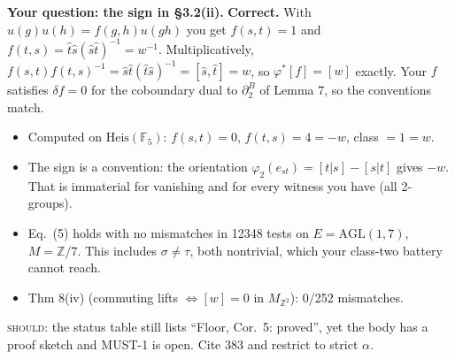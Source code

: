 \documentclass[10pt]{article}
\newcommand{\Z}{\mathbb{Z}}
\newcommand{\iss}[1]{\textsc{#1}}
\begin{document}
\textbf{Your question: the sign in \S3.2(ii).} \textbf{Correct.} With $u(g)u(h)=f(g,h)u(gh)$ you get $f(s,t)=1$ and $f(t,s)=\hat t\hat s(\hat s\hat t)^{-1}=w^{-1}$. Multiplicatively, $f(s,t)f(t,s)^{-1}=\hat s\hat t(\hat t\hat s)^{-1}=[\hat s,\hat t]=w$, so $\varphi^*[f]=[w]$ exactly. Your $f$ satisfies $\delta f=0$ for the coboundary dual to $\partial^B_2$ of Lemma 7, so the conventions match.
\begin{itemize}
\item Computed on $\mathrm{Heis}(\mathbb F_5)$: $f(s,t)=0$, $f(t,s)=4=-w$, class $=1=w$.
\item The sign is a convention: the orientation $\varphi_2(e_{st})=[t|s]-[s|t]$ gives $-w$. That is immaterial for vanishing and for every witness you have (all 2-groups).
\item Eq.~(5) holds with no mismatches in 12348 tests on $E=\mathrm{AGL}(1,7)$, $M=\Z/7$. This includes $\sigma\neq\tau$, both nontrivial, which your class-two battery cannot reach.
\item Thm 8(iv) (commuting lifts $\iff[w]=0$ in $M_{\Z^2}$): 0/252 mismatches.
\end{itemize}
\iss{should}: the status table still lists ``Floor, Cor.~5: proved'', yet the body has a proof sketch and MUST-1 is open. Cite 383 and restrict to strict $\alpha$.
\end{document}
